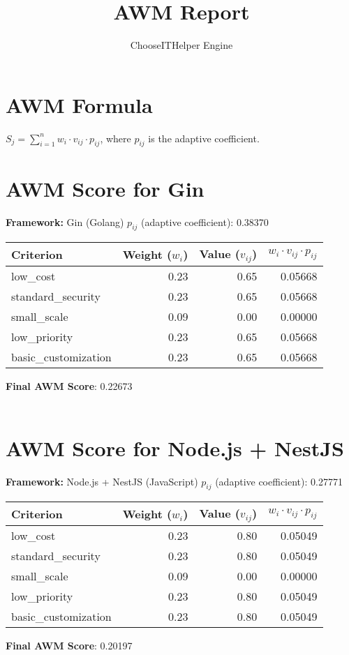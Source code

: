 \documentclass{article}
\title{AWM Report}
\author{ChooseITHelper Engine}
\begin{document}
\maketitle
\section*{AWM Formula}
$S_j = \sum_{i=1}^{n} w_i \cdot v_{ij} \cdot p_{ij}$, where $p_{ij}$ is the adaptive coefficient.
\section*{AWM Score for Gin}
\textbf{Framework:} Gin (Golang)
$p_{ij}$ (adaptive coefficient): 0.38370
\begin{longtable}{l r r r} 
\toprule
Criterion & Weight ($w_i$) & Value ($v_{ij}$) & $w_i \cdot v_{ij} \cdot p_{ij}$ \\ \midrule
low\_cost & 0.23 & 0.65 & 0.05668 \\
standard\_security & 0.23 & 0.65 & 0.05668 \\
small\_scale & 0.09 & 0.00 & 0.00000 \\
low\_priority & 0.23 & 0.65 & 0.05668 \\
basic\_customization & 0.23 & 0.65 & 0.05668 \\
\bottomrule \end{longtable}
\textbf{Final AWM Score}: 0.22673 \\\\
\section*{AWM Score for Node.js + NestJS}
\textbf{Framework:} Node.js + NestJS (JavaScript)
$p_{ij}$ (adaptive coefficient): 0.27771
\begin{longtable}{l r r r} 
\toprule
Criterion & Weight ($w_i$) & Value ($v_{ij}$) & $w_i \cdot v_{ij} \cdot p_{ij}$ \\ \midrule
low\_cost & 0.23 & 0.80 & 0.05049 \\
standard\_security & 0.23 & 0.80 & 0.05049 \\
small\_scale & 0.09 & 0.00 & 0.00000 \\
low\_priority & 0.23 & 0.80 & 0.05049 \\
basic\_customization & 0.23 & 0.80 & 0.05049 \\
\bottomrule \end{longtable}
\textbf{Final AWM Score}: 0.20197 \\\\
\end{document}
